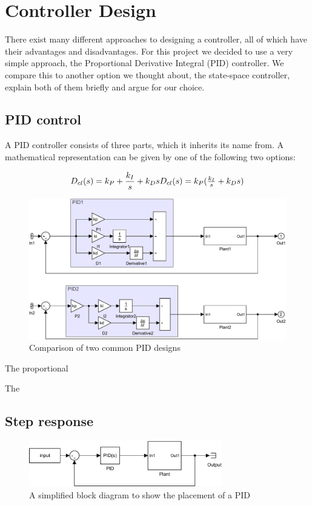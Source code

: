 \chapter{Controller Design}\label{ch:controldesign}
There exist many different approaches to designing a controller,
all of which have their advantages and disadvantages.
For this project we decided to use a very simple approach,
the Proportional Derivative Integral (PID) controller.
We compare this to another option we thought about,
the state-space controller, explain both of them briefly
and argue for our choice.

\section{PID control}\label{sec:PID}
A PID controller consists of three parts,
which it inherits its name from.
A mathematical representation can be given by one of the following two options:

\begin{equation}
	  D_{cl}(s) = k_P + \frac{k_I}{s} + k_D s$$
	$$D_{cl}(s) = k_P ( \frac{k_I}{s} + k_D s)
	 \label{eq:PID}
\end{equation}
\begin{figure}[H]
    \centering
    \includegraphics[width=\textwidth]{figures/07controllerDesign/PID_explicit.pdf}
    \caption{Comparison of two common PID designs}
	\label{fig:twoPID}
\end{figure}

The proportional 

The 

\section{Step response}
\begin{figure}[H]
    \centering
    \includegraphics[width=0.75\textwidth]{figures/04ExperimentsAndLabWork/CLblock.pdf}
    \caption{A simplified block diagram to show the placement of a PID}
	\label{fig:PIDplace}
\end{figure}

